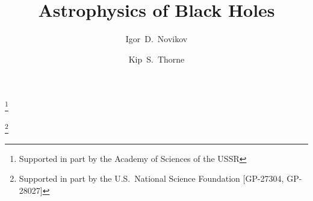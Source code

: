 

\title{Astrophysics of Black Holes}

\author{Igor~D.~Novikov}
\thanks{Supported in part by the Academy of Sciences of the USSR}

\author{Kip~S.~Thorne}
\thanks{Supported in part by the U.S.\ National Science Foundation [GP-27304, GP-28027]}

\maketitle


\tableofcontents


